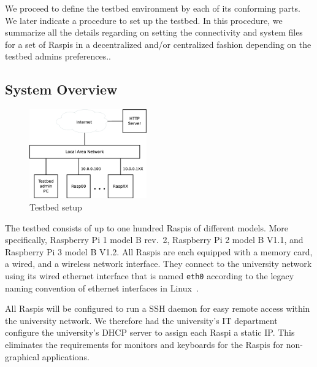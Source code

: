 \label{sec:testbed}

We proceed to define the testbed environment by each of its conforming
parts. We later indicate a procedure to set up the testbed. In this procedure,
we summarize all the details regarding on setting the connectivity and
system files for a set of \ac{Raspi}s in a decentralized and/or centralized fashion
depending on the testbed admins preferences..

\subsection{System Overview}


\begin{figure}[ht!]
\centering
\includegraphics[width=0.45\textwidth]{images/testbed_setup3.eps}
\caption{Testbed setup}
\label{fig:testbed_setup}
\end{figure}

The testbed consists of up to one hundred \ac{Raspi}s of different models.
More specifically, Raspberry Pi 1 model B rev.~2,
Raspberry Pi 2 model B V1.1, and Raspberry Pi 3 model B V1.2.
All \ac{Raspi}s are each equipped with a memory card, a wired, and a wireless
network interface. They connect to the university network using its wired
ethernet interface that is named \texttt{eth0} according to the legacy naming
convention of ethernet interfaces in Linux~\cite{PredictableNetworkInterfaceNames}.

All \ac{Raspi}s will be configured to run a \ac{SSH} daemon for easy remote access
within the university network. We therefore had the university's \ac{IT}
department configure the university's \ac{DHCP} server to assign each \ac{Raspi} a
static \ac{IP}. This eliminates the requirements for monitors and keyboards
for the \ac{Raspi}s for non-graphical applications.

